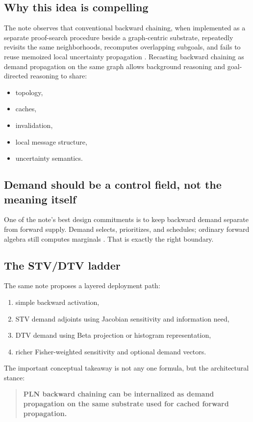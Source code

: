 \documentclass[11pt]{article}
\begin{document}
\subsection{Why this idea is compelling}
The note observes that conventional backward chaining, when implemented as a separate proof-search procedure beside a graph-centric substrate, repeatedly revisits the same neighborhoods, recomputes overlapping subgoals, and fails to reuse memoized local uncertainty propagation \cite{goertzel2026factor}. Recasting backward chaining as demand propagation on the same graph allows background reasoning and goal-directed reasoning to share:
\begin{itemize}
    \item topology,
    \item caches,
    \item invalidation,
    \item local message structure,
    \item uncertainty semantics.
\end{itemize}

\subsection{Demand should be a control field, not the meaning itself}
One of the note's best design commitments is to keep backward demand separate from forward supply. Demand selects, prioritizes, and schedules; ordinary forward algebra still computes marginals \cite{goertzel2026factor}. That is exactly the right boundary.

\subsection{The STV/DTV ladder}
The same note proposes a layered deployment path:
\begin{enumerate}
    \item simple backward activation,
    \item STV demand adjoints using Jacobian sensitivity and information need,
    \item DTV demand using Beta projection or histogram representation,
    \item richer Fisher-weighted sensitivity and optional demand vectors.
\end{enumerate}

The important conceptual takeaway is not any one formula, but the architectural stance:
\begin{quote}
\textbf{PLN backward chaining can be internalized as demand propagation on the same substrate used for cached forward propagation.}
\end{quote}
\end{document}

